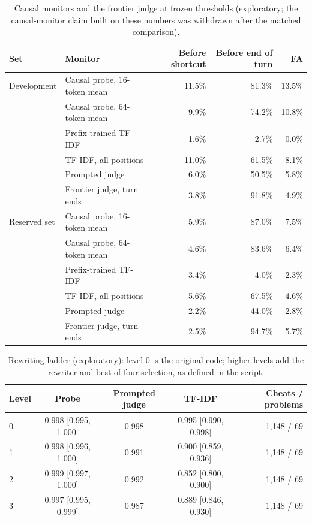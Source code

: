 \documentclass[10pt]{article}
\begin{document}
\begin{table}[ht]
\centering\footnotesize
\caption{Causal monitors and the frontier judge at frozen thresholds (exploratory; the causal-monitor claim built on these numbers was withdrawn after the matched comparison).}
\label{tab:app-endturn}
\vspace{6pt}
\begin{tabular}{llrrr}
\toprule
Set & Monitor & Before shortcut & Before end of turn & FA \\
\midrule
Development & Causal probe, 16-token mean & 11.5\% & 81.3\% & 13.5\% \\
 & Causal probe, 64-token mean & 9.9\% & 74.2\% & 10.8\% \\
 & Prefix-trained TF-IDF & 1.6\% & 2.7\% & 0.0\% \\
 & TF-IDF, all positions & 11.0\% & 61.5\% & 8.1\% \\
 & Prompted judge & 6.0\% & 50.5\% & 5.8\% \\
 & Frontier judge, turn ends & 3.8\% & 91.8\% & 4.9\% \\
\midrule
Reserved set & Causal probe, 16-token mean & 5.9\% & 87.0\% & 7.5\% \\
 & Causal probe, 64-token mean & 4.6\% & 83.6\% & 6.4\% \\
 & Prefix-trained TF-IDF & 3.4\% & 4.0\% & 2.3\% \\
 & TF-IDF, all positions & 5.6\% & 67.5\% & 4.6\% \\
 & Prompted judge & 2.2\% & 44.0\% & 2.8\% \\
 & Frontier judge, turn ends & 2.5\% & 94.7\% & 5.7\% \\
\bottomrule
\end{tabular}
\end{table}

\begin{table}[ht]
\centering\footnotesize
\caption{Rewriting ladder (exploratory): level 0 is the original code; higher levels add the rewriter and best-of-four selection, as defined in the script.}
\label{tab:app-ladder}
\vspace{6pt}
\begin{tabular}{lcccr}
\toprule
Level & Probe & Prompted judge & TF-IDF & Cheats / problems \\
\midrule
0 & 0.998 [0.995, 1.000] & 0.998 & 0.995 [0.990, 0.998] & 1,148 / 69 \\
1 & 0.998 [0.996, 1.000] & 0.991 & 0.900 [0.859, 0.936] & 1,148 / 69 \\
2 & 0.999 [0.997, 1.000] & 0.992 & 0.852 [0.800, 0.900] & 1,148 / 69 \\
3 & 0.997 [0.995, 0.999] & 0.987 & 0.889 [0.846, 0.930] & 1,148 / 69 \\
\bottomrule
\end{tabular}
\end{table}
\end{document}

